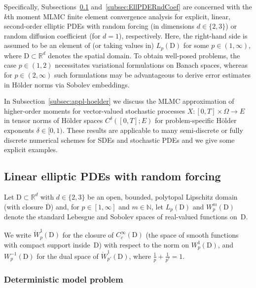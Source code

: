 \documentclass[reqno]{amsart}
\numberwithin{equation}{section}
\newcommand{\bbN}{\mathbb{N}}
\newcommand{\bbR}{\mathbb{R}}
\newcommand{\dom}{\mathrm{D}}
\newcommand{\Wo}{\mathring{W}}
\newcommand{\from}{\colon}
\theoremstyle{remark}
\theoremstyle{definition}
\begin{document}
Specifically, Subsections~\ref{subsec:EllPDERnDFor} 
and~\ref{subsec:EllPDERndCoef} 
are concerned with 
the $k$th moment 
MLMC finite element convergence 
analysis for explicit, linear, 
second-order elliptic PDEs 
with random forcing (in dimensions $d\in\{2,3\}$)
or random diffusion coefficient (for $d=1$), 
respectively. 
Here, the right-hand side is assumed to 
be an element of 
(or taking values in) 
$L_p(\dom)$ for some $p\in(1,\infty)$, 
where $\dom\subset\bbR^d$ denotes the spatial domain. 
To obtain well-posed problems, 
the case $p\in(1,2)$ necessitates 
variational formulations on Banach spaces, 
whereas for $p\in(2,\infty)$ 
such formulations may be advantageous 
to derive error estimates in H\"older norms 
via Sobolev embeddings. 

In Subsection~\ref{subsec:appl-hoelder} 
we discuss the MLMC approximation 
of higher-order moments 
for vector-valued stochastic 
processes ${X\from [0,T]\times\Omega\to E}$ 
in tensor norms of 
H\"older spaces $C^\delta([0,T];E)$ 
for problem-specific 
H\"older exponents $\delta\in[0,1)$. 
These results  
are applicable to many 
semi-discrete or fully discrete 
numerical schemes 
for SDEs and stochastic PDEs 
and we give some explicit examples. 

\subsection{Linear elliptic PDEs with random forcing} 
\label{subsec:EllPDERnDFor}

Let $\dom\subset \bbR^d$ with $d\in\{2,3\}$ 
be an open, bounded, 
polytopal Lipschitz domain (with closure $\overline{\dom}$)  
and, for $p\in[1,\infty]$ and $m\in\bbN$, 
let $L_p(\dom)$ and $W^m_p(\dom)$  
denote the standard Lebesgue 
and Sobolev spaces 
of real-valued functions on~$\dom$. 

We write ${\Wo}^1_p(\dom)$ for the 
closure of $C^\infty_c(\dom)$ 
(the space of smooth functions 
with compact support inside~$\dom$) 
with respect to the norm 
on $W^1_p(\dom)$, 
and $W^{-1}_p(\dom)$ 
for the dual space of $\Wo^1_{p'}(\dom)$, 
where 
$\frac{1}{p} + \frac{1}{p'}=1$.  

\subsubsection{Deterministic model problem} 
\end{document}
